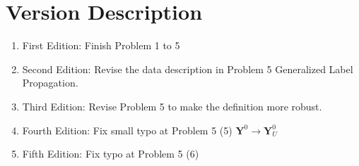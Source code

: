 \documentclass{article}
\begin{document}
 \section*{Version Description}
 \begin{enumerate}
     \item First Edition: Finish Problem 1 to 5
     \item Second Edition: Revise the data description in Problem 5 Generalized Label Propagation.
     \item Third Edition: Revise Problem 5 to make the definition more robust.
     \item Fourth Edition: Fix small typo at Problem 5 (5) $\boldsymbol{Y}^0 \rightarrow \boldsymbol{Y}_U^0$
     \item Fifth Edition: Fix typo at Problem 5 (6)
 \end{enumerate}
\end{document}
